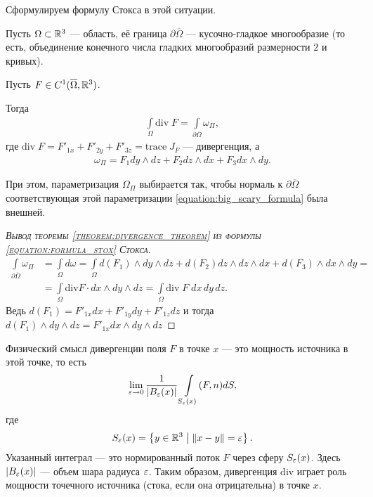 Сформулируем формулу Стокса в этой ситуации.

\begin{thm}
\label{theorem:divergence_theorem}
Пусть $\Omega \subset \mathbb{R}^{3}$  --- область, её граница $\partial \overline \Omega$  --- кусочно-гладкое многообразие (то есть, объединение конечного числа гладких многообразий размерности $2$ и кривых).

Пусть $F \in C^{1}(\overline \Omega, \mathbb{R}^{3})$.

Тогда
\begin{align*}
 \int\limits_{\Omega} \mathrm{div}\;F  = \int\limits_{\partial \overline \Omega} \omega_{\Pi}
,\end{align*} где $\mathrm{div}\;F = F'_{1x} + F'_{2y} + F'_{3z} = \mathrm{trace}\;J_F$ --- дивергенция, а
\begin{align*}
 \omega_{\Pi} = F_1 dy \land dz + F_2 dz \land dx + F_3 dx \land dy
.\end{align*}

При этом, параметризация $\Omega_{\Pi}$ выбирается так, чтобы нормаль к $\partial \overline \Omega$ соответствующая этой параметризации \eqref{equation:big_scary_formula} была внешней.
\end{thm}
\begin{proof}[\normalfont\textsc{Вывод теоремы \eqref{theorem:divergence_theorem} из формулы \eqref{equation:formula_stox} Стокса}]
 \begin{align*}
  \int\limits_{\partial \overline \Omega} \omega_{\Pi} &= \int\limits_{\Omega} d \omega = \int\limits_{\Omega} d(F_1) \land dy \land dz + d(F_2) dz \land dz \land dx + d(F_3) \land dx \land dy = \\
  &= \int\limits_{\Omega} \mathrm{div} F \cdot dx \land dy \land dz = \int\limits_{\Omega} \mathrm{div}\; F\; dx \, dy \, dz
 .\end{align*} 
 Ведь $d(F_1) = F'_{1x}dx + F'_{1y}dy + F'_{1z}dz$ и тогда $d(F_1) \land dy \land dz = F'_{1x}dx \land dy \land dz$
\end{proof}

\begin{remrk*}
Физический смысл дивергенции поля $F$ в точке $x$ --- это мощность источника в этой точке, то есть
\begin{align*}
 \lim_{\varepsilon \to 0}  \frac{1}{\left| B_{\varepsilon}(x) \right|} \int\limits_{S_{\varepsilon}(x)} (F, n) dS
,\end{align*} где \begin{align*}
S_{\varepsilon}(x) = \left\{ y \in \mathbb{R}^{3} \;\middle|\; \left\| x - y \right\| = \varepsilon \right\}
.\end{align*} 
Указанный интеграл --- это нормированный поток $F$ через сферу $S_{\varepsilon}(x)$. Здесь $\left| B_{\varepsilon}(x) \right|$ --- объем шара радиуса $\varepsilon$. Таким образом, дивергенция $\mathrm{div}$ играет роль мощности точечного источника (стока, если она отрицательна) в точке $x$.
\end{remrk*}

